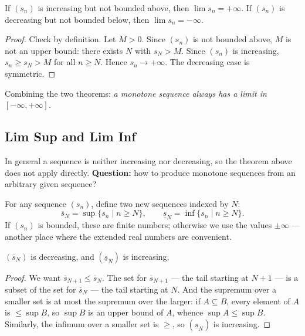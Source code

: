 \documentclass[11pt]{report}
\begin{document}
\begin{thmbox}
If $(s_n)$ is increasing but not bounded above, then $\lim s_n = +\infty$. If $(s_n)$ is decreasing but not bounded below, then $\lim s_n = -\infty$.
\end{thmbox}

\begin{proof}
Check by definition. Let $M > 0$. Since $(s_n)$ is not bounded above, $M$ is not an upper bound: there exists $N$ with $s_N > M$. Since $(s_n)$ is increasing, $s_n \geq s_N > M$ for all $n \geq N$. Hence $s_n \to +\infty$. The decreasing case is symmetric.
\end{proof}

Combining the two theorems: \emph{a monotone sequence always has a limit in $[-\infty, +\infty]$.}

\subsection{Lim Sup and Lim Inf}

In general a sequence is neither increasing nor decreasing, so the theorem above does not apply directly. \textbf{Question:} how to produce monotone sequences from an arbitrary given sequence?

\begin{defbox}
For any sequence $(s_n)$, define two new sequences indexed by $N$:
\[
\overline{s}_N = \sup \{ s_n \mid n \geq N \}, \qquad \underline{s}_N = \inf \{ s_n \mid n \geq N \}.
\]
If $(s_n)$ is bounded, these are finite numbers; otherwise we use the values $\pm\infty$ --- another place where the extended real numbers are convenient.
\end{defbox}

\begin{lembox}
$(\overline{s}_N)$ is decreasing, and $(\underline{s}_N)$ is increasing.
\end{lembox}

\begin{proof}
We want $\overline{s}_{N+1} \leq \overline{s}_N$. The set for $\overline{s}_{N+1}$ --- the tail starting at $N+1$ --- is a subset of the set for $\overline{s}_N$ --- the tail starting at $N$. And the supremum over a smaller set is at most the supremum over the larger: if $A \subseteq B$, every element of $A$ is $\leq \sup B$, so $\sup B$ is an upper bound of $A$, whence $\sup A \leq \sup B$. Similarly, the infimum over a smaller set is $\geq$, so $(\underline{s}_N)$ is increasing.
\end{proof}
\end{document}
